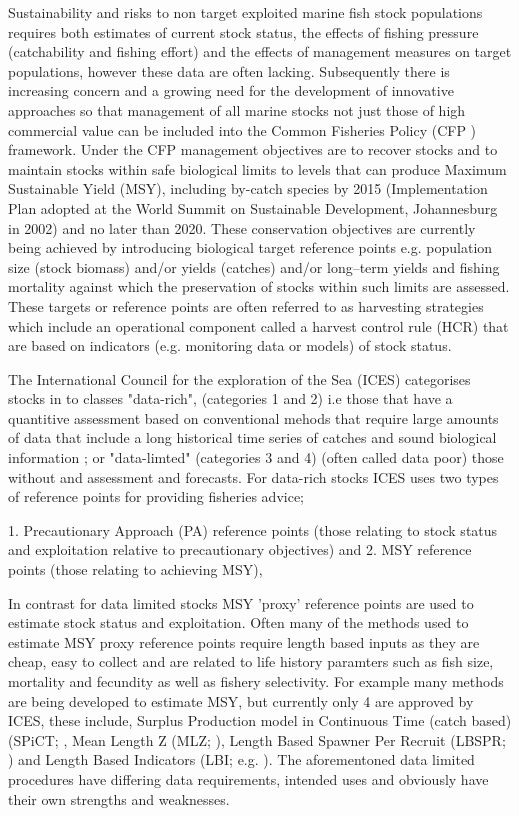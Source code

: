 \documentclass[preprint,12pt]{elsarticle}
\begin{document}
Sustainability and risks to non target exploited marine fish stock populations requires both estimates of current stock status, the effects of fishing pressure (catchability and fishing effort) and the effects of management measures on target populations, however these data are often lacking.  Subsequently there is increasing concern and a growing need for the development of innovative approaches so that management of all marine stocks not just those of high commercial value can be included into the Common Fisheries Policy (CFP \cite{EU 2013}) framework. Under the CFP management objectives are to recover stocks and to maintain stocks within safe biological limits to levels that can produce Maximum Sustainable Yield (MSY), including by-catch species by 2015 (Implementation Plan adopted at the World Summit on Sustainable Development, Johannesburg in 2002) and no later than 2020. These conservation objectives are currently being achieved by introducing biological target reference points e.g. population size (stock biomass) and/or yields (catches) and/or long–term yields and fishing mortality against which the preservation of stocks within such limits are assessed. These targets or reference points are often referred to as harvesting strategies which include an operational component called a harvest control rule (HCR) that are based on indicators (e.g. monitoring data or models) of stock status. 

The International Council for the exploration of the Sea (ICES) categorises stocks in to classes "data-rich", (categories 1 and 2) i.e those that have a quantitive assessment based on conventional mehods that require large amounts of data that include a long historical time series of catches and sound biological information \cite{Bentley, 2015}; or "data-limted" \cite{Costello et al 2015}(categories 3 and 4) (often called data poor) those without and assessment and forecasts. For data-rich stocks ICES uses two types of reference points for providing fisheries advice; 

1. Precautionary Approach (PA) reference points (those relating to stock status and exploitation relative to precautionary objectives) and 
2. MSY reference points (those relating to achieving MSY), 

In contrast for data limited stocks MSY 'proxy' reference points are used to estimate stock status and exploitation.  Often many of the methods used to estimate MSY proxy reference points require length based inputs as they are cheap, easy to collect \cite{Quinn and Deriso, 1999} and are related to life history paramters such as fish size, mortality and fecundity as well as fishery selectivity. For example many methods are being developed to estimate MSY, but currently only 4 are approved by ICES, these include, Surplus Production model in Continuous Time (catch based) (SPiCT; \cite{Pedersen and Berg, 2016}, Mean Length Z (MLZ; \cite{Gedamke & Hoenig, 2016}), Length Based Spawner Per Recruit (LBSPR; \cite{Hordyk et al 2015}) and Length Based Indicators (LBI; e.g. \cite{Probst et al 2013}). The aforementoned data limited procedures have differing data requirements, intended uses and obviously have their own strengths and weaknesses. 
\end{document}
